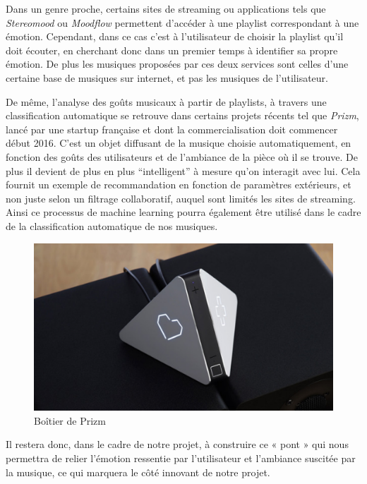 Dans un genre proche, certains sites de streaming ou applications tels que \emph{Stereomood} ou \emph{Moodflow} permettent d'accéder à une playlist correspondant à une émotion.
Cependant, dans ce cas c'est à l'utilisateur de choisir la playlist qu'il doit écouter, en cherchant donc dans un premier temps à identifier sa propre émotion.
De plus les musiques proposées par ces deux services sont celles d'une certaine base de musiques sur internet, et pas les musiques de l'utilisateur.

De même, l'analyse des goûts musicaux à partir de playlists, à travers une classification automatique se retrouve dans certains projets récents tel que \textit{Prizm}, lancé par une startup française et dont la commercialisation doit commencer début 2016.
C'est un objet diffusant de la musique choisie automatiquement, en fonction des goûts des utilisateurs et de l'ambiance de la pièce où il se trouve.
De plus il devient de plus en plus “intelligent” à mesure qu'on interagit avec lui.
Cela fournit un exemple de recommandation en fonction de paramètres extérieurs, et non juste selon un filtrage collaboratif, auquel sont limités les sites de streaming.
Ainsi ce processus de machine learning pourra également être utilisé dans le cadre de la classification automatique de nos musiques.

\begin{figure}[htp]
\centering
\includegraphics[scale=0.70]{./images/etatArt3.png}
\caption{Boîtier de Prizm}
\end{figure}

Il restera donc, dans le cadre de notre projet, à construire ce « pont » qui nous permettra de relier l’émotion ressentie par l’utilisateur et l’ambiance suscitée par la musique, ce qui marquera le côté innovant de notre projet.
